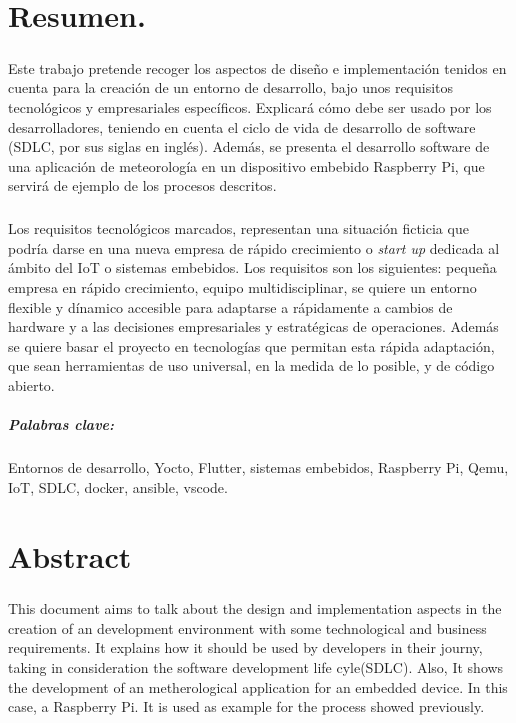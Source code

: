 \chapter{Resumen.}

\paragraph{}Este trabajo pretende recoger los aspectos de diseño e implementación
tenidos en cuenta para la creación de un entorno de desarrollo, bajo unos requisitos
tecnológicos y empresariales específicos. Explicará cómo debe ser usado por los
desarrolladores, teniendo en cuenta el ciclo de vida de desarrollo de software (SDLC,
por sus siglas en inglés). Además, se presenta el desarrollo software de una aplicación
de meteorología en un dispositivo embebido Raspberry Pi, que servirá de ejemplo de
los procesos descritos.

\paragraph{}Los requisitos tecnológicos marcados, representan una situación ficticia
que podría darse en una nueva empresa de rápido crecimiento o \textit{start up} dedicada
al ámbito del IoT o sistemas embebidos. Los requisitos son los siguientes:
pequeña empresa en rápido crecimiento, equipo multidisciplinar, se quiere un entorno
flexible y dínamico accesible para adaptarse a rápidamente a cambios de hardware y
a las decisiones empresariales y estratégicas de operaciones. Además se quiere basar
el proyecto en tecnologías que permitan esta rápida adaptación, que sean herramientas
de uso universal, en la medida de lo posible, y de código abierto.

\paragraph{Palabras clave:} Entornos de desarrollo, Yocto, Flutter, sistemas embebidos,
 Raspberry Pi, Qemu, IoT, SDLC, docker, ansible, vscode.

\chapter{Abstract}

\paragraph{}This document aims to talk about the design and implementation aspects in
the creation of an development environment with some technological and business requirements.
It explains how it should be used by developers in their journy, taking in consideration
the software development life cyle(SDLC). Also, It shows the development of an
metherological application for an embedded device. In this case, a Raspberry Pi. It
is used as example for the process showed previously.

